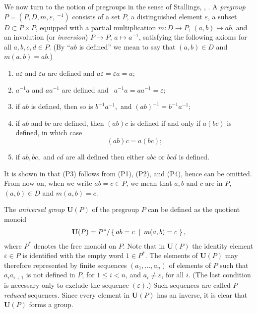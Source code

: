 \documentclass[a4paper]{article}
\newcommand\eps{\varepsilon}
\newcommand{\Uvec}{\mathbf{U}}	%
\newcommand{\UP}{\Uvec(P)}
\newcommand{\set}[2]{\left\{\, \mathinner{#1}\vphantom{#2}\; \left|\; \vphantom{#1}\mathinner{#2} \right.\,\right\}}
\theoremstyle{plain}
\theoremstyle{definition}
\begin{document}
We now turn to the notion of pregroups in the sense of Stallings,
\cite{Stallings_1971}, \cite{Stallings_1987}.
A \emph{pregroup} $P=(P,D,m,\eps,~^{-1})$ consists of a set $P$,  a distinguished element
$\eps$, a subset $D\subset P\times P$,  
equipped with  a partial multiplication %
$m:D \to P$, $(a,b) \mapsto ab$, 
and an involution (or \emph{inversion}) %
$P \to P$, $a \mapsto a^{-1}$, satisfying the following axioms
for all $a,b,c,d \in P$. (By ``$ab$ is defined'' we mean to say that
$(a,b)\in D$ and $m(a,b)=ab$.)
\begin{enumerate}[(P1)]
\item  %
$a \eps$ and $\eps  a$ are defined and
$a \eps = \eps a = a;$
\item  %
$a^{-1} a$ and $a a^{-1}$ are defined and $ \ \
a^{-1} a = a a^{-1} = \eps;$
\item  %
if $ a b$ is defined, then so is
$b^{-1} a^{-1},$ and
$(a  b)^{-1} = b^{-1} a^{-1};$
\item  \label{it:P4}%
if $a  b$ and $b
c$ are defined, then $(a b) c$ is defined if and only if $a (b
c)$ is defined, in which case
$$ (a b) c =  a (b c);$$
\item   \label{it:P5} %
if $a  b, b  c,$ and $c  d$
are all defined then either $a  b  c$ or $b
c  d$ is defined.
\end{enumerate}
It is shown in \cite{Hoare_1988}
that (P3) follows from (P1), (P2), and (P4), hence can be omitted.
From now on, when we write $ab=c\in P$, we mean that $a,b$ and $c$ are in $P$, 
$(a,b)\in D$ and $m(a,b)=c$. 

The \emph{universal group}  $\UP$  of the pregroup $P$ can be defined as the quotient
monoid
\begin{align*}
\UP = %
P^*/\set{ab=c}{m(a,b)=c},
\end{align*}
where $P^*$ denotes the free monoid on $P$. Note that in $\UP$ the identity element 
$\eps \in P$ is identified
 with the empty word $1 \in P^*$.
The elements of $\UP$ may
therefore represented by
finite sequences $(a_1, \ldots, a_n)$ of elements
of $P$ such that $a_ia_{i+1}$ is not defined in $P$, for $1\leq
i<n$, and $a_i\neq \eps$, for all $i$. (The last condition
is necessary only to exclude the sequence $(\eps)$.)  
Such sequences are called {\em $P$-reduced} sequences.
Since every element in $\UP$ has an inverse, it is clear that
$\UP$ forms a group. 
\end{document}
